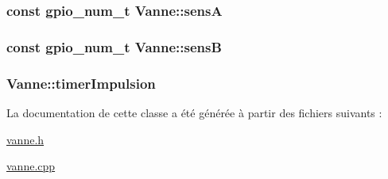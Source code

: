 \subsubsection[{\texorpdfstring{sensA}{sensA}}]{\setlength{\rightskip}{0pt plus 5cm}const gpio\+\_\+num\+\_\+t Vanne\+::sensA\hspace{0.3cm}{\ttfamily [private]}}\hypertarget{class_vanne_ae5e8b2f4a69751a996ff535ff56c44bf}{}\label{class_vanne_ae5e8b2f4a69751a996ff535ff56c44bf}
\subsubsection[{\texorpdfstring{sensB}{sensB}}]{\setlength{\rightskip}{0pt plus 5cm}const gpio\+\_\+num\+\_\+t Vanne\+::sensB\hspace{0.3cm}{\ttfamily [private]}}\hypertarget{class_vanne_ad50ee3497ec27d35b52b17531f0019b3}{}\label{class_vanne_ad50ee3497ec27d35b52b17531f0019b3}
\subsubsection[{\texorpdfstring{timer\+Impulsion}{timerImpulsion}}]{ Vanne\+::timer\+Impulsion\hspace{0.3cm}{\ttfamily [private]}}\hypertarget{class_vanne_a3cc616e595d81a083fe79dc1a5a74fa2}{}\label{class_vanne_a3cc616e595d81a083fe79dc1a5a74fa2}


La documentation de cette classe a été générée à partir des fichiers suivants \+:\begin{DoxyCompactItemize}
\item 
\hyperlink{vanne_8h}{vanne.\+h}\item 
\hyperlink{vanne_8cpp}{vanne.\+cpp}\end{DoxyCompactItemize}

